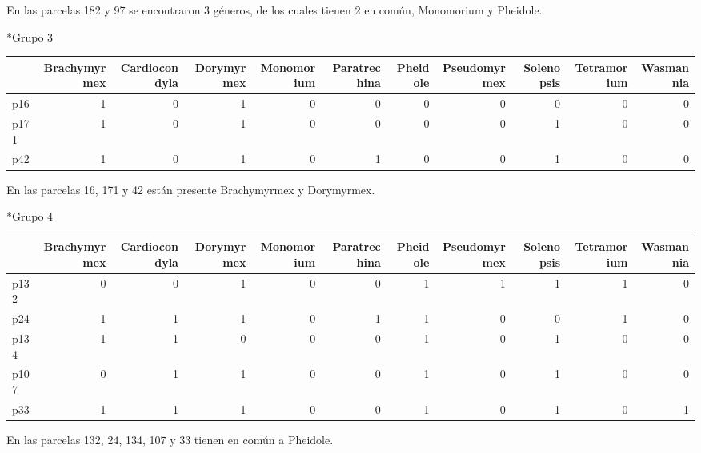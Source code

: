 \documentclass[11pt,]{article}
\newenvironment{Shaded}{\begin{snugshade}}{\end{snugshade}}
\newcommand{\KeywordTok}[1]{\textcolor[rgb]{0.13,0.29,0.53}{\textbf{#1}}}
\newcommand{\StringTok}[1]{\textcolor[rgb]{0.31,0.60,0.02}{#1}}
\newcommand{\OperatorTok}[1]{\textcolor[rgb]{0.81,0.36,0.00}{\textbf{#1}}}
\newcommand{\NormalTok}[1]{#1}
\begin{document}
En las parcelas 182 y 97 se encontraron 3 géneros, de los cuales tienen
2 en común, Monomorium y Pheidole.

*Grupo 3

\begin{Shaded}
\end{Shaded}

\begin{longtable}[]{@{}lrrrrrrrrrr@{}}
\toprule
& Brachymyrmex & Cardiocondyla & Dorymyrmex & Monomorium & Paratrechina
& Pheidole & Pseudomyrmex & Solenopsis & Tetramorium &
Wasmannia\tabularnewline
\midrule
\endhead
p16 & 1 & 0 & 1 & 0 & 0 & 0 & 0 & 0 & 0 & 0\tabularnewline
p171 & 1 & 0 & 1 & 0 & 0 & 0 & 0 & 1 & 0 & 0\tabularnewline
p42 & 1 & 0 & 1 & 0 & 1 & 0 & 0 & 1 & 0 & 0\tabularnewline
\bottomrule
\end{longtable}

En las parcelas 16, 171 y 42 están presente Brachymyrmex y Dorymyrmex.

*Grupo 4

\begin{Shaded}
\end{Shaded}

\begin{longtable}[]{@{}lrrrrrrrrrr@{}}
\toprule
& Brachymyrmex & Cardiocondyla & Dorymyrmex & Monomorium & Paratrechina
& Pheidole & Pseudomyrmex & Solenopsis & Tetramorium &
Wasmannia\tabularnewline
\midrule
\endhead
p132 & 0 & 0 & 1 & 0 & 0 & 1 & 1 & 1 & 1 & 0\tabularnewline
p24 & 1 & 1 & 1 & 0 & 1 & 1 & 0 & 0 & 1 & 0\tabularnewline
p134 & 1 & 1 & 0 & 0 & 0 & 1 & 0 & 1 & 0 & 0\tabularnewline
p107 & 0 & 1 & 1 & 0 & 0 & 1 & 0 & 1 & 0 & 0\tabularnewline
p33 & 1 & 1 & 1 & 0 & 0 & 1 & 0 & 1 & 0 & 1\tabularnewline
\bottomrule
\end{longtable}

En las parcelas 132, 24, 134, 107 y 33 tienen en común a Pheidole.
\end{document}
